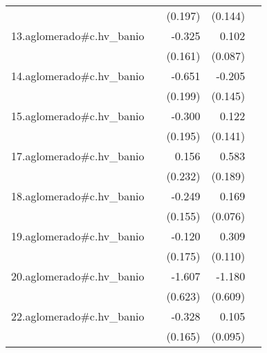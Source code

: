 {\begin{longtable}{l*{4}{D{.}{.}{-1}}}
            &                     &     (0.197)         &     (0.144)         &                     \\
\addlinespace
13.aglomerado#c.hv\_banio&                     &      -0.325\sym{*}  &       0.102         &                     \\
            &                     &     (0.161)         &     (0.087)         &                     \\
\addlinespace
14.aglomerado#c.hv\_banio&                     &      -0.651\sym{**} &      -0.205         &                     \\
            &                     &     (0.199)         &     (0.145)         &                     \\
\addlinespace
15.aglomerado#c.hv\_banio&                     &      -0.300         &       0.122         &                     \\
            &                     &     (0.195)         &     (0.141)         &                     \\
\addlinespace
17.aglomerado#c.hv\_banio&                     &       0.156         &       0.583\sym{**} &                     \\
            &                     &     (0.232)         &     (0.189)         &                     \\
\addlinespace
18.aglomerado#c.hv\_banio&                     &      -0.249         &       0.169\sym{*}  &                     \\
            &                     &     (0.155)         &     (0.076)         &                     \\
\addlinespace
19.aglomerado#c.hv\_banio&                     &      -0.120         &       0.309\sym{**} &                     \\
            &                     &     (0.175)         &     (0.110)         &                     \\
\addlinespace
20.aglomerado#c.hv\_banio&                     &      -1.607\sym{**} &      -1.180         &                     \\
            &                     &     (0.623)         &     (0.609)         &                     \\
\addlinespace
22.aglomerado#c.hv\_banio&                     &      -0.328\sym{*}  &       0.105         &                     \\
            &                     &     (0.165)         &     (0.095)         &                     \\

\end{longtable}}
